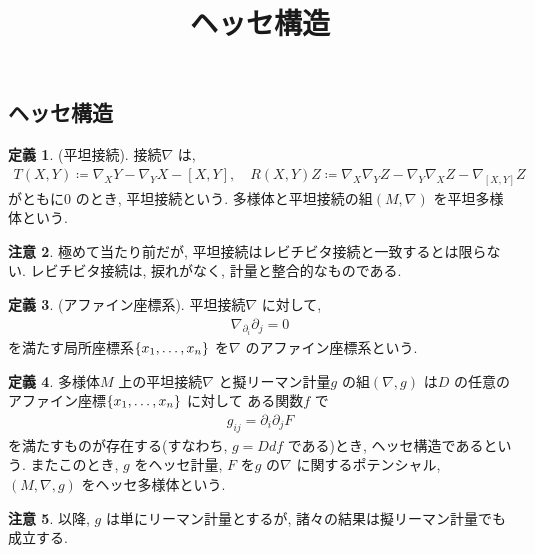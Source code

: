 \documentclass[10pt, fleqn, label-section=none]{bxjsarticle}
\title{ヘッセ構造}
\date{}
\author{}
\theoremstyle{definition}
\newtheorem{dfn}{定義}[section]
\newtheorem{remark}[dfn]{注意}
\newcommand{\cbra}[1]{\mleft\{#1\mright\}}
\renewcommand{\;}{\, ; \,}
\begin{document}
\maketitle



\section{}
\subsection{ヘッセ構造}
\begin{dfn}(平坦接続). 接続$\nabla$ は, 
\begin{align*} T(X,Y) \coloneqq \nabla_X Y - \nabla_Y X - [X, Y], \quad R(X, Y)Z \coloneqq \nabla_X \nabla_Y Z - \nabla_Y \nabla_X Z - \nabla_{[X, Y]} Z\end{align*}
がともに$0$ のとき, 平坦接続という. 多様体と平坦接続の組$(M, \nabla)$ を平坦多様体という. 
\end{dfn}

\begin{remark}
極めて当たり前だが, 平坦接続はレビチビタ接続と一致するとは限らない. レビチビタ接続は, 捩れがなく, 計量と整合的なものである. 
\end{remark}


\begin{dfn}(アファイン座標系). 平坦接続$\nabla$ に対して, 
\begin{align*} \nabla_{\partial_i} \partial_j = 0 \end{align*}
を満たす局所座標系$\cbra{x_1, \ldots , x_n}$ を$\nabla$ のアファイン座標系という. 
\end{dfn}

\begin{dfn}多様体$M$ 上の平坦接続$\nabla$ と擬リーマン計量$g$ の組$(\nabla, g)$ は$D$ の任意のアファイン座標$\cbra{x_1, \ldots , x_n}$ に対して ある関数$f$ で
\begin{align*} g_{ij} = \partial_i \partial_j F \end{align*}
を満たすものが存在する(すなわち, $g = Ddf$ である)とき, ヘッセ構造であるという. またこのとき, $g$ をヘッセ計量, $F$ を$g$ の$\nabla$ に関するポテンシャル, $(M, \nabla, g)$ をヘッセ多様体という. 
\end{dfn}

\begin{remark}
以降, $g$ は単にリーマン計量とするが, 諸々の結果は擬リーマン計量でも成立する. 
\end{remark}
\end{document}
